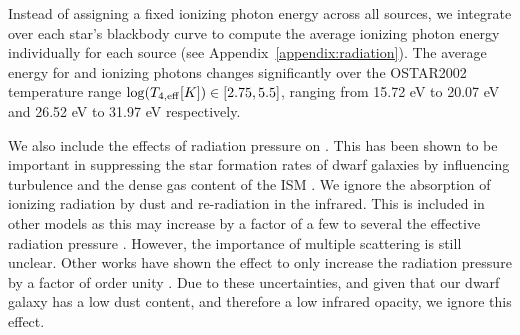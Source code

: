 \documentclass[twocolumn]{aastex61}
\begin{document}

Instead of assigning a fixed ionizing photon energy across all sources, we integrate over each star's blackbody curve to compute the average ionizing photon energy individually for each source (see Appendix~\ref{appendix:radiation}). The average energy for  and  ionizing photons changes significantly over the OSTAR2002 temperature range $\log(T_{4,\rm{eff}} [K]) \in \left[2.75,5.5\right]$, ranging from 15.72 eV to 20.07 eV and 26.52 eV to 31.97 eV respectively.

We also include the effects of radiation pressure on . This has been shown to be important in suppressing the star formation rates of dwarf galaxies by influencing turbulence and the dense gas content of the ISM \citep{WiseAbel2012,Ceverino2014}. We ignore the absorption of ionizing radiation by dust and re-radiation in the infrared. This is included in other models \citep[e.g.][]{Rosdahl2015,FIRE,FIRE2} as this may increase by a factor of a few to several the effective radiation pressure \citep{ZhangDavis2017}. However, the importance of multiple scattering is still unclear. Other works have shown the effect to only increase the radiation pressure by a factor of order unity \citep{Krumholz2012,Krumholz2013,Reissl2017,Wibking2018}. Due to these uncertainties, and given that our dwarf galaxy has a low dust content, and therefore a low infrared opacity, we ignore this effect. 
\end{document}
